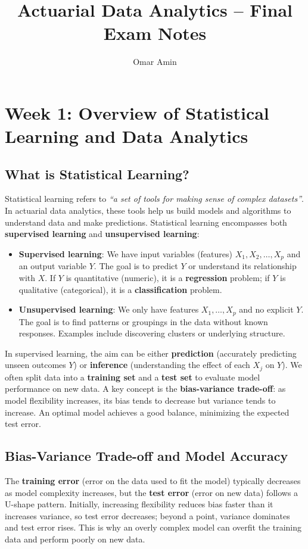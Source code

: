 \documentclass[11pt]{article}
\begin{document}
\title{Actuarial Data Analytics -- Final Exam Notes}
\author{Omar Amin}
\date{}
\maketitle

\tableofcontents

\newpage

\section{Week 1: Overview of Statistical Learning and Data Analytics}
\subsection{What is Statistical Learning?}
Statistical learning refers to \textit{``a set of tools for making sense of complex datasets''}. In actuarial data analytics, these tools help us build models and algorithms to understand data and make predictions. Statistical learning encompasses both \textbf{supervised learning} and \textbf{unsupervised learning}:
\begin{itemize}
    \item \textbf{Supervised learning}: We have input variables (features) $X_1, X_2, \ldots, X_p$ and an output variable $Y$. The goal is to predict $Y$ or understand its relationship with $X$. If $Y$ is quantitative (numeric), it is a \textbf{regression} problem; if $Y$ is qualitative (categorical), it is a \textbf{classification} problem.
    \item \textbf{Unsupervised learning}: We only have features $X_1,\ldots,X_p$ and no explicit $Y$. The goal is to find patterns or groupings in the data without known responses. Examples include discovering clusters or underlying structure.
\end{itemize}

In supervised learning, the aim can be either \textbf{prediction} (accurately predicting unseen outcomes $Y$) or \textbf{inference} (understanding the effect of each $X_j$ on $Y$). We often split data into a \textbf{training set} and a \textbf{test set} to evaluate model performance on new data. A key concept is the \textbf{bias-variance trade-off}: as model flexibility increases, its bias tends to decrease but variance tends to increase. An optimal model achieves a good balance, minimizing the expected test error.

\subsection{Bias-Variance Trade-off and Model Accuracy}
The \textbf{training error} (error on the data used to fit the model) typically decreases as model complexity increases, but the \textbf{test error} (error on new data) follows a U-shape pattern. Initially, increasing flexibility reduces bias faster than it increases variance, so test error decreases; beyond a point, variance dominates and test error rises. This is why an overly complex model can overfit the training data and perform poorly on new data.
\end{document}
